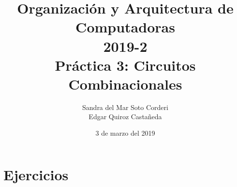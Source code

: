 \documentclass{article}
\begin{document}
    \title{
        Organización y Arquitectura de Computadoras \\
        2019-2 \\
        Práctica 3: Circuitos Combinacionales
    }
    \author{
        Sandra del Mar Soto Corderi \\
        Edgar Quiroz Castañeda
    }
    \date{
        3 de marzo del 2019
    }

    \maketitle

    \section{Ejercicios}
\end{document}
